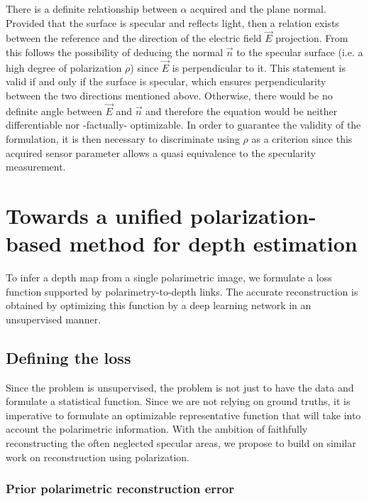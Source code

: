 There is a definite relationship between $\alpha$ acquired and the plane normal. Provided that the surface is specular and reflects light, then a relation exists between the reference and the direction of the electric field $\vec{E}$ projection.
From this follows the possibility of deducing the normal $\vec{n}$ to the specular surface (i.e. a high degree of polarization $\rho$) since $\vec{E}$ is perpendicular to it. This statement is valid if and only if the surface is specular, which ensures perpendicularity between the two directions mentioned above. Otherwise, there would be no definite angle between $\vec{E}$ and $\vec{n}$ and therefore the equation would be neither differentiable nor -factually- optimizable. 
In order to guarantee the validity of the formulation, it is then necessary to discriminate using $\rho$ as a criterion since this acquired sensor parameter allows a quasi equivalence to the specularity measurement. 

\section{Towards a unified polarization-based method for depth estimation}
To infer a depth map from a single polarimetric image, we formulate a loss function supported by polarimetry-to-depth links. The accurate reconstruction is obtained by optimizing this function by a deep learning network in an unsupervised manner.
\subsection{Defining the loss}

Since the problem is unsupervised, the problem is not just to have the data and formulate a statistical function. Since we are not relying on ground truths, it is imperative to formulate an optimizable representative function that will take into account the polarimetric information. With the ambition of faithfully reconstructing the often neglected specular areas, we propose to build on similar work on reconstruction using polarization.

\subsubsection{Prior polarimetric reconstruction error}


